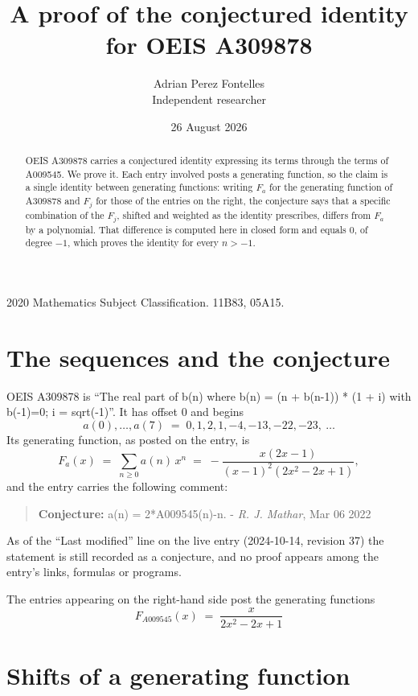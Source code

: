 \documentclass[11pt,a4paper]{article}
\title{A proof of the conjectured identity for OEIS A309878}
\author{Adrian Perez Fontelles\\ \small Independent researcher}
\date{26 August 2026}
\theoremstyle{plain}
\theoremstyle{definition}
\begin{document}
\maketitle

\begin{abstract}
OEIS A309878 carries a conjectured identity expressing its terms through the terms of
A009545. We prove it. Each entry involved posts a generating function, so the claim is
a single identity between generating functions: writing $F_{a}$ for the generating
function of A309878 and $F_{j}$ for those of the entries on the right, the conjecture
says that a specific combination of the $F_{j}$, shifted and weighted as the identity
prescribes, differs from $F_{a}$ by a polynomial. That difference is computed here in
closed form and equals $0$, of degree $-1$, which proves the identity for
every $n>-1$.
\end{abstract}

\noindent\small 2020 Mathematics Subject Classification. 11B83, 05A15.\normalsize

\section{The sequences and the conjecture}

OEIS A309878 is ``The real part of b(n) where b(n) = (n + b(n-1)) * (1 + i) with b(-1)=0; i = sqrt(-1)''. It has offset $0$ and begins
\[
a(0),\dots,a(7)\;=\;0, 1, 2, 1, -4, -13, -22, -23,\ \dots
\]
Its generating function, as posted on the entry, is
\begin{equation}\label{eq:gf}
F_{a}(x)\;=\;\sum_{n\ge 0} a(n)\,x^{n}\;=\;- \frac{x \left(2 x - 1\right)}{\left(x - 1\right)^{2} \left(2 x^{2} - 2 x + 1\right)} ,
\end{equation}
and the entry carries the following comment:
\begin{quote}\small
\textbf{Conjecture:} a(n) = 2*A009545(n)-n. - \emph{R. J. Mathar}, Mar 06 2022
\end{quote}
As of the ``Last modified'' line on the live entry (2024-10-14, revision 37) the
statement is still recorded as a conjecture, and no proof appears among the entry's links,
formulas or programs.

The entries appearing on the right-hand side post the generating functions
\[
F_{A009545}(x) \;=\; \frac{x}{2 x^{2} - 2 x + 1}
\]

\section{Shifts of a generating function}
\end{document}
